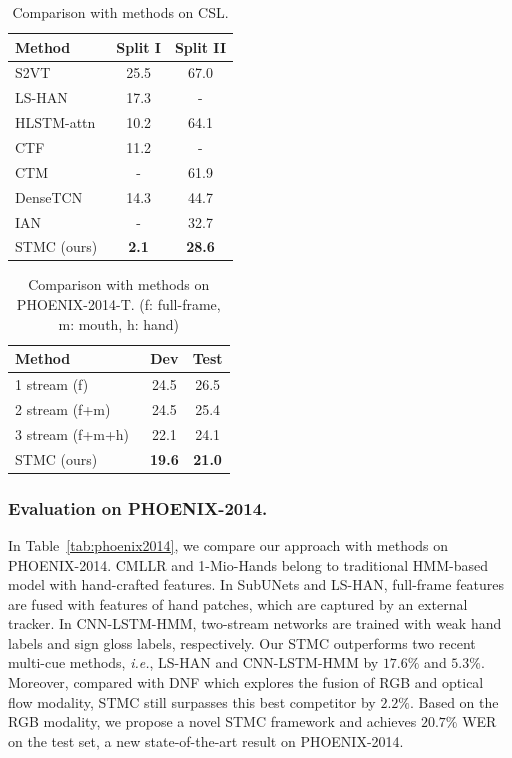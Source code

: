\documentclass[letterpaper]{article} %
\begin{document}
\begin{table}[tp]
    \centering
    \small
    \caption{Comparison with methods on CSL.} \label{tab:CSL}
    \begin{tabular}{l|c|c}
    \hline
    Method                          & Split I & Split II  \\ \hline
    S2VT~\cite{s2vt-v}              & 25.5    & 67.0      \\
    LS-HAN~\cite{han}               & 17.3    &  -        \\
    HLSTM-attn~\cite{hlstm}         & 10.2    & 64.1      \\
    CTF~\cite{MM}                   & 11.2    &  -        \\
    CTM~\cite{ctm}                  &  -      & 61.9      \\
    DenseTCN~\cite{densetcn}        & 14.3    & 44.7      \\
    IAN~\cite{ian}                  &  -      & 32.7      \\ \hline
    STMC (ours)                     & \textbf{2.1}     & \textbf{28.6}      \\ \hline
    \end{tabular}
\end{table}


\begin{table}[tp]
    \centering
    \small
    \caption{Comparison with methods on PHOENIX-2014-T. (f: full-frame, m: mouth, h: hand)} \label{tab:phoenix-2014-t}
    \begin{tabular}{l|c|c}
    \hline
    Method                              & Dev & Test  \\ \hline
    1 stream (f)~\cite{tpami19}         & 24.5    & 26.5      \\
    2 stream (f+m)~\cite{tpami19}       & 24.5    & 25.4      \\
    3 stream (f+m+h)~\cite{tpami19}     & 22.1    & 24.1      \\ \hline
    STMC (ours)                         & \textbf{19.6}     & \textbf{21.0}      \\ \hline
    \end{tabular}
\end{table}


\subsubsection{Evaluation on PHOENIX-2014.} In Table~\ref{tab:phoenix2014}, we compare our approach with methods on PHOENIX-2014.
CMLLR and 1-Mio-Hands belong to traditional HMM-based model with hand-crafted features. In SubUNets and LS-HAN, full-frame features are fused with features of hand patches, which are captured by an external tracker. In CNN-LSTM-HMM, two-stream networks are trained with weak hand labels and sign gloss labels, respectively. Our STMC outperforms two recent multi-cue methods, \emph{i.e.}, LS-HAN and CNN-LSTM-HMM by $17.6\%$ and $5.3\%$. Moreover, compared with DNF which explores the fusion of RGB and optical flow modality, STMC still surpasses this best competitor by $2.2\%$. Based on the RGB modality, we propose a novel STMC framework and achieves $20.7\%$ WER on the test set, a new state-of-the-art result on PHOENIX-2014.
\end{document}

